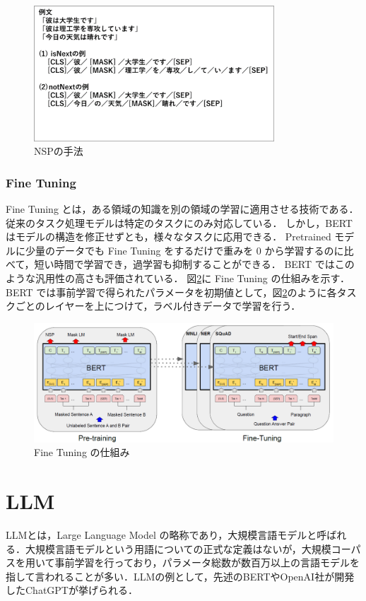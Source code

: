 \begin{figure}[H]
	\centering
	\includegraphics[width=90mm]{image/BERT-nsp.png}
	\caption{NSPの手法}
	\label{nsp}
\end{figure}

\subsubsection{Fine Tuning}
Fine Tuning とは，ある領域の知識を別の領域の学習に適用させる技術である．
従来のタスク処理モデルは特定のタスクにのみ対応している．
しかし，BERT はモデルの構造を修正せずとも，様々なタスクに応用できる．
Pretrained モデルに少量のデータでも Fine Tuning をするだけで重みを 0 から学習するのに比べて，短い時間で学習でき，過学習も抑制することができる．
BERT ではこのような汎用性の高さも評価されている．
図\ref{finetuning}に Fine Tuning の仕組みを示す．
BERT では事前学習で得られたパラメータを初期値として，図\ref{finetuning}のように各タスクごとのレイヤーを上につけて，ラベル付きデータで学習を行う．

\begin{figure}[H]
	\centering
	\includegraphics[width=120mm]{image/BERT-finetuning.png}
	\caption{Fine Tuning の仕組み}
	\label{finetuning}
\end{figure}



\section{LLM \label{c4s6}}
LLMとは，Large Language Model の略称であり，大規模言語モデルと呼ばれる．大規模言語モデルという用語についての正式な定義はないが，大規模コーパスを用いて事前学習を行っており，パラメータ総数が数百万以上の言語モデルを指して言われることが多い．LLMの例として，先述のBERTやOpenAI社が開発したChatGPTが挙げられる．


